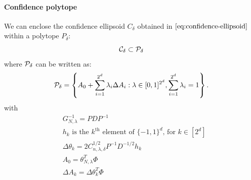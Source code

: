 \documentclass{article}
\begin{document}
{%



}
\paragraph{Confidence polytope}

\begin{proposition}
We can enclose the confidence ellipsoid $C_\delta$ obtained in $\eqref{eq:confidence-ellipsoid}$ within a polytope $P_\delta$:
\[\mathcal{C}_\delta \subset \mathcal{P}_\delta\]
where $\mathcal{P}_\delta$ can be written as:
\begin{equation}
     \mathcal{P}_\delta = \left\{ A_{0}+\sum_{i=1}^{2^d}\lambda_{i}\Delta A_{i}: \lambda\in[0, 1]^{2^d},  \sum_{i=1}^{2^d}\lambda_{i}=1\right\}.
\end{equation}
with 
\begin{align*}
    &G_{N,\lambda}^{-1} = PDP^{-1}\\
    &h_k \text{ is the }k^\text{th}\text{ element of }\{-1,1\}^d\text{, for } k\in[2^d]\\
    &\Delta\theta_k = 2 C_{n,\lambda,\delta}^{1/2} P^{-1}D^{-1/2} h_k \\
    &A_0 = \theta_{N,\lambda}^T\Phi\\
    &\Delta A_k = \Delta\theta_k^T\Phi\\
\end{align*}
\end{proposition}
\end{document}
